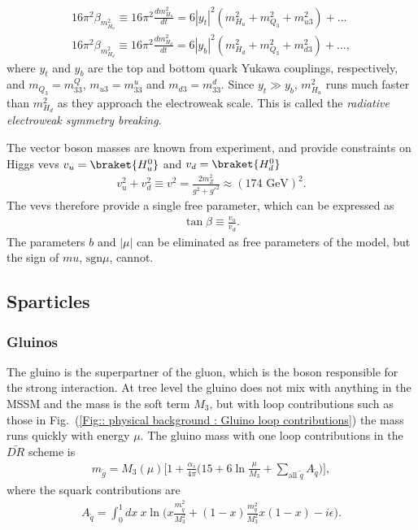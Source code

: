 \documentclass[twoside,english]{uiofysmaster}
\begin{document}
\begin{align}
16 \pi^2\beta_{m_{H_u}^2} \equiv 16 \pi^2 \frac{d m_{H_u}^2}{dt} = 6 |y_t|^2(m_{H_u}^2 + m_{Q_3}^2 + m_{u3}^2) +...\\
16 \pi^2\beta_{m_{H_d}^2} \equiv 16 \pi^2 \frac{d m_{H_d}^2}{dt} = 6 |y_b|^2(m_{H_d}^2 + m_{Q_3}^2 + m_{d3}^2) +...,
\end{align} 
where $y_t$ and $y_b$ are the top and bottom quark Yukawa couplings, respectively, and $m_{Q_3} = m_{33}^Q$, $m_{u3}= m_{33}^u$ and $m_{d3} = m_{33}^d$. Since $y_t \gg y_b$, $m_{H_u}^2$ runs much faster than $m_{H_d}^2$ as they approach the electroweak scale. This is called the \textit{radiative electroweak symmetry breaking}.

The vector boson masses are known from experiment, and provide constraints on Higgs vevs $v_u = \braket{H_u^0}$ and $v_d = \braket{H_d^0}$
\begin{align}
v_u^2 + v_d^2 \equiv v^2 = \frac{2m_Z^2}{g^2 + {g'}^2} \approx (174 \text{ GeV})^2.
\end{align} 
The vevs therefore provide a single free parameter, which can be expressed as
\begin{align}
\tan \beta \equiv \frac{v_u}{v_d}.
\end{align}
The parameters $b$ and $|\mu|$ can be eliminated as free parameters of the model, but the sign of $mu$, $\text{sgn} \mu$, cannot.

\subsection{Sparticles}

\subsubsection{Gluinos}

The gluino is the superpartner of the gluon, which is the boson responsible for the strong interaction. At tree level the gluino does not mix with anything in the MSSM and the mass is the soft term $M_3$, but with loop contributions such as those in Fig.\ (\ref{Fig:: physical background : Gluino loop contributions}) the mass runs quickly with energy $\mu$. The gluino mass with one loop contributions in the $\bar{DR}$ scheme is
\begin{align}
m_{\tilde{g}} = M_3 (\mu) \Bigg[ 1 + \frac{\alpha_s}{4 \pi} \Bigg( 15 + 6 \ln \frac{\mu}{M_3} + \sum_{\text{all } \tilde{q}} A_{\tilde{q}} \Bigg) \Bigg],
\end{align}
where the squark contributions are
\begin{align}
A_{\tilde{q}} = \int_0^1 dx~ x \ln \big(x \frac{m_{\tilde{q}}^2}{M_3^2} + (1-x) \frac{m_q^2}{M_3^2} x(1-x) - i \epsilon \big).
\end{align}
\end{document}
